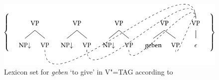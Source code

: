 \begin{figure}
\centerline{%
\includegraphics{Figures/tag-geben-set-lsp-cropped}
}
\caption{\label{Abbildung-Lexical-Set-geben-V-TAG}Lexicon set for \emph{geben} `to give' in V"=TAG
  according to \citet[]{Rambow94a}}
\end{figure}%

